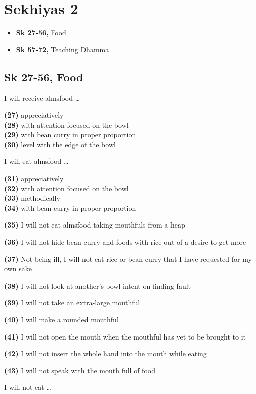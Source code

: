 \chapter{Sekhiyas 2}

\begin{itemize}
\tightlist
\item
  \textbf{Sk 27-56,} Food
\item
  \textbf{Sk 57-72,} Teaching Dhamma
\end{itemize}

\section{Sk 27-56, Food}

I will receive almsfood \ldots{}

\textbf{(27)} appreciatively\\
\textbf{(28)} with attention focused on the bowl\\
\textbf{(29)} with bean curry in proper proportion\\
\textbf{(30)} level with the edge of the bowl

I will eat almsfood \ldots{}

\textbf{(31)} appreciatively\\
\textbf{(32)} with attention focused on the bowl\\
\textbf{(33)} methodically\\
\textbf{(34)} with bean curry in proper proportion

\textbf{(35)} I will not eat almsfood taking mouthfuls from a heap

\textbf{(36)} I will not hide bean curry and foods with rice out of a
desire to get more

\textbf{(37)} Not being ill, I will not eat rice or bean curry that I
have requested for my own sake

\textbf{(38)} I will not look at another's bowl intent on finding fault

\textbf{(39)} I will not take an extra-large mouthful

\textbf{(40)} I will make a rounded mouthful

\textbf{(41)} I will not open the mouth when the mouthful has yet to be
brought to it

\textbf{(42)} I will not insert the whole hand into the mouth while
eating

\textbf{(43)} I will not speak with the mouth full of food

I will not eat \ldots{}

